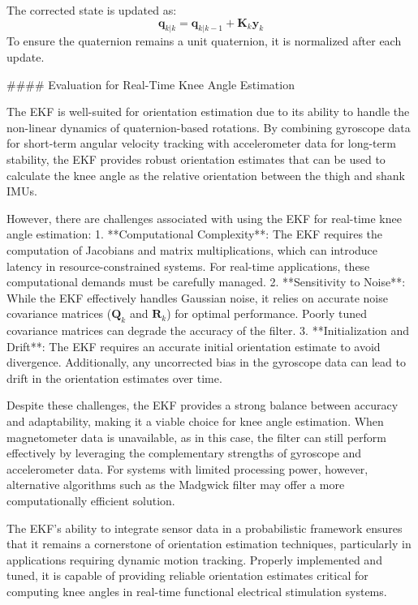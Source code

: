 The corrected state is updated as:
\[
\mathbf{q}_{k|k} = \mathbf{q}_{k|k-1} + \mathbf{K}_k \mathbf{y}_k
\]
To ensure the quaternion remains a unit quaternion, it is normalized after each update.

#### Evaluation for Real-Time Knee Angle Estimation

The EKF is well-suited for orientation estimation due to its ability to handle the non-linear dynamics of quaternion-based rotations. By combining gyroscope data for short-term angular velocity tracking with accelerometer data for long-term stability, the EKF provides robust orientation estimates that can be used to calculate the knee angle as the relative orientation between the thigh and shank IMUs.

However, there are challenges associated with using the EKF for real-time knee angle estimation:
1. **Computational Complexity**: The EKF requires the computation of Jacobians and matrix multiplications, which can introduce latency in resource-constrained systems. For real-time applications, these computational demands must be carefully managed.
2. **Sensitivity to Noise**: While the EKF effectively handles Gaussian noise, it relies on accurate noise covariance matrices (\( \mathbf{Q}_k \) and \( \mathbf{R}_k \)) for optimal performance. Poorly tuned covariance matrices can degrade the accuracy of the filter.
3. **Initialization and Drift**: The EKF requires an accurate initial orientation estimate to avoid divergence. Additionally, any uncorrected bias in the gyroscope data can lead to drift in the orientation estimates over time.

Despite these challenges, the EKF provides a strong balance between accuracy and adaptability, making it a viable choice for knee angle estimation. When magnetometer data is unavailable, as in this case, the filter can still perform effectively by leveraging the complementary strengths of gyroscope and accelerometer data. For systems with limited processing power, however, alternative algorithms such as the Madgwick filter may offer a more computationally efficient solution.

The EKF’s ability to integrate sensor data in a probabilistic framework ensures that it remains a cornerstone of orientation estimation techniques, particularly in applications requiring dynamic motion tracking. Properly implemented and tuned, it is capable of providing reliable orientation estimates critical for computing knee angles in real-time functional electrical stimulation systems.